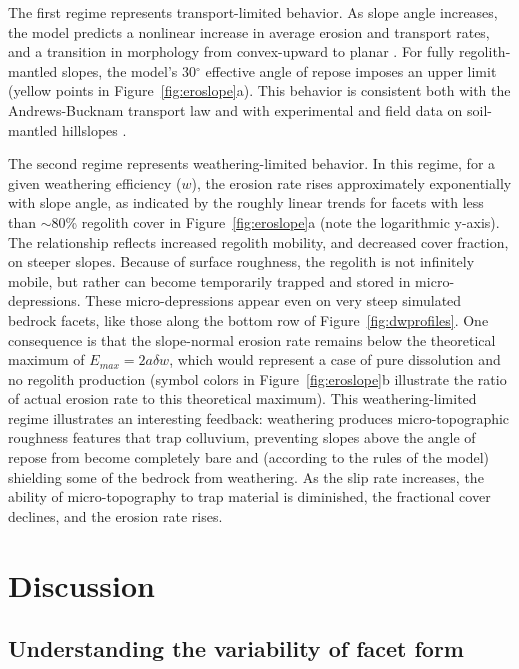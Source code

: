 The first regime represents transport-limited behavior. As slope angle increases, the model predicts a nonlinear increase in average erosion and transport rates, and a transition in morphology from convex-upward to planar \citep{tucker2018lattice}. For fully regolith-mantled slopes, the model's 30$^\circ$ effective angle of repose imposes an upper limit (yellow points in Figure~\ref{fig:eroslope}a). This behavior is consistent both with the Andrews-Bucknam transport law \citep{andrews1987fitting,roering1999evidence} and with experimental and field data on soil-mantled hillslopes \citep{roering2001hillslope,binnie2007tectonic,roering2008well,ouimet2009beyond,stock2009spatial,dibiase2012hillslope}.

The second regime represents weathering-limited behavior. In this regime, for a given weathering efficiency ($w$), the erosion rate rises approximately exponentially with slope angle, as indicated by the roughly linear trends for facets with less than $\sim$80\% regolith cover in Figure~\ref{fig:eroslope}a (note the logarithmic y-axis). The relationship reflects increased regolith mobility, and decreased cover fraction, on steeper slopes. Because of surface roughness, the regolith is not infinitely mobile, but rather can become temporarily trapped and stored in micro-depressions. These micro-depressions appear even on very steep simulated bedrock facets, like those along the bottom row of Figure~\ref{fig:dwprofiles}. One consequence is that the slope-normal erosion rate remains below  the theoretical maximum of $E_{max} = 2a\delta w$, which would represent a case of pure dissolution and no regolith production (symbol colors in Figure~\ref{fig:eroslope}b illustrate the ratio of actual erosion rate to this theoretical maximum). This weathering-limited regime illustrates an interesting feedback: weathering produces micro-topographic roughness features that trap colluvium, preventing slopes above the angle of repose from become completely bare and (according to the rules of the model) shielding some of the bedrock from weathering. As the slip rate increases, the ability of micro-topography to trap material is diminished, the fractional cover declines, and the erosion rate rises.


\section{Discussion}

\subsection{Understanding the variability of facet form}

